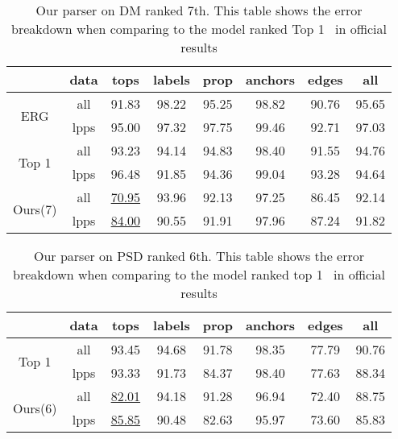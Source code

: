 \begin{table}[!h]
\small
\centering
\setlength{\tabcolsep}{2.5pt}
\begin{tabular}{cccccccc}
  \toprule
                            & data & tops              & labels & prop  & anchors & edges & all   \\ \hline
  \multirow{2}{*}{ ERG }    & all  & 91.83             & 98.22  & 95.25 & 98.82   & 90.76 & 95.65 \\
                            & lpps & 95.00             & 97.32  & 97.75 & 99.46   & 92.71 & 97.03 \\
  \multirow{2}{*}{Top 1}    & all  & 93.23             & 94.14  & 94.83 & 98.40   & 91.55 & 94.76 \\
                            & lpps & 96.48             & 91.85  & 94.36 & 99.04   & 93.28 & 94.64 \\
  \multirow{2}{*}{ Ours(7)} & all  & \underline{70.95} & 93.96  & 92.13 & 97.25   & 86.45 & 92.14 \\
                            & lpps & \underline{84.00} & 90.55  & 91.91 & 97.96   & 87.24 & 91.82 \\ \bottomrule
\end{tabular}
\caption{\label{tbl:results_dm} Our parser on DM ranked 7th. This table shows the error breakdown when comparing to the model ranked Top 1~\cite{Li:Zha:Zha:19} in official results}
\end{table}



\begin{table}[!h]
\small
\centering
\setlength{\tabcolsep}{2.5pt}
\begin{tabular}{cccccccc}
\toprule
                          & data & tops              & labels & prop  & anchors & edges & all   \\ \hline
\multirow{2}{*}{Top 1}   & all  & 93.45             & 94.68  & 91.78 & 98.35   & 77.79 & 90.76 \\
                          & lpps & 93.33             & 91.73  & 84.37 & 98.40   & 77.63 & 88.34 \\
\multirow{2}{*}{ Ours(6)} & all  & \underline{82.01} & 94.18  & 91.28 & 96.94   & 72.40 & 88.75 \\
                          & lpps & \underline{85.85} & 90.48  & 82.63 & 95.97   & 73.60 & 85.83 \\ \bottomrule
\end{tabular}
\caption{\label{tbl:results_psd} Our parser on PSD ranked 6th. This table shows the error breakdown when comparing to the model ranked top 1~\cite{Don:Fow:Gro:19} in official results}
\end{table}

